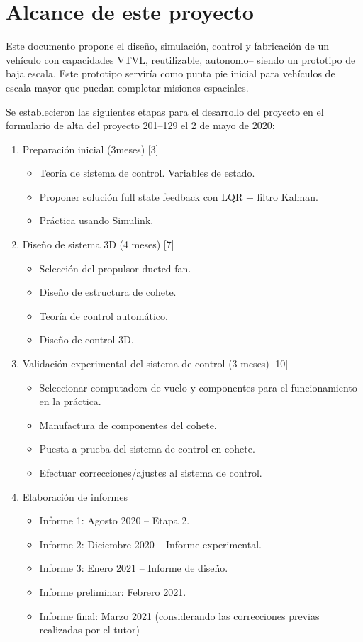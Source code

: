 \null\newpage
\clearpage

\section{Alcance de este proyecto}\label{sec:scope}
Este documento propone el diseño, simulación, control y fabricación de un vehículo con capacidades VTVL, reutilizable, autonomo-- siendo un prototipo de baja escala. Este prototipo serviría como punta pie inicial para vehículos de escala mayor que puedan completar misiones espaciales. 

Se establecieron las siguientes etapas para el desarrollo del proyecto en el formulario de alta del proyecto 201--129 el 2 de mayo de 2020:
\begin{enumerate}
    \item Preparación inicial (3meses) [3]
    \begin{itemize}
        \item Teoría de sistema de control. Variables de estado.
        \item Proponer solución full state feedback con LQR + filtro Kalman.
        \item Práctica usando Simulink.
    \end{itemize}
    \item Diseño de sistema 3D (4 meses) [7]
    \begin{itemize}
        \item Selección del propulsor ducted fan.
        \item Diseño de estructura de cohete.
        \item Teoría de control automático.
        \item Diseño de control 3D.
    \end{itemize}
    \item Validación experimental del sistema de control (3 meses) [10]
    \begin{itemize}
        \item Seleccionar computadora de vuelo y componentes para el funcionamiento en la práctica.
        \item Manufactura de componentes del cohete.
        \item Puesta a prueba del sistema de control en cohete.
        \item Efectuar correcciones/ajustes al sistema de control.
    \end{itemize}
    \item Elaboración de informes
    \begin{itemize}
        \item Informe 1: Agosto 2020 -- Etapa 2.
        \item Informe 2: Diciembre 2020 -- Informe experimental.
        \item Informe 3: Enero 2021 -- Informe de diseño.
        \item Informe preliminar: Febrero 2021.
        \item Informe final: Marzo 2021 (considerando las correcciones previas realizadas por el tutor)
    \end{itemize}
\end{enumerate}

